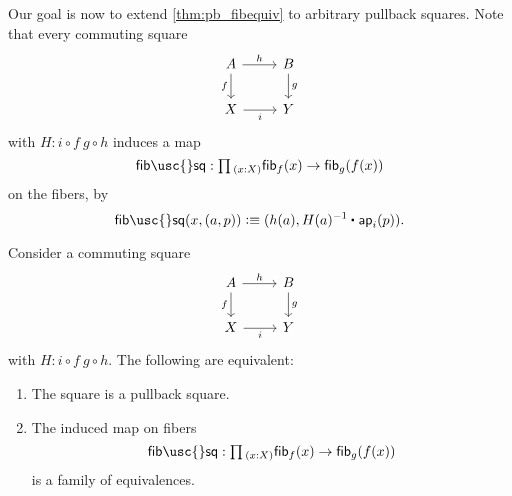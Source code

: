 Our goal is now to extend \cref{thm:pb_fibequiv} to
arbitrary pullback squares. Note that every commuting
square
\begin{equation*}
\begin{tikzcd}
A \arrow[d,swap,"f"] \arrow[r,"h"] & B \arrow[d,"g"] \\
X \arrow[r,swap,"i"] & Y
\end{tikzcd}
\end{equation*}
with $H: i\circ f ~ g \circ h$ induces a map
\begin{equation*}
\mathsf{fib\usc{}sq} : \prd{x:X} \fib{f}{x} \to \fib{g}{f(x)}
\end{equation*}
on the fibers, by
\begin{equation*}
\mathsf{fib\usc{}sq}(x,(a,p))\defeq (h(a),\ct{H(a)^{-1}}{\ap{i}{p}}).
\end{equation*}

\begin{thm}\label{cor:pb_fibequiv}
Consider a commuting square
\begin{equation*}
\begin{tikzcd}
A \arrow[d,swap,"f"] \arrow[r,"h"] & B \arrow[d,"g"] \\
X \arrow[r,swap,"i"] & Y
\end{tikzcd}
\end{equation*}
with $H: i\circ f ~ g \circ h$. The following are equivalent:
\begin{enumerate}
\item The square is a pullback square.
\item The induced map on fibers
\begin{equation*}
\mathsf{fib\usc{}sq} : \prd{x:X} \fib{f}{x} \to \fib{g}{f(x)}
\end{equation*}
is a family of equivalences.
\end{enumerate}
\end{thm}

